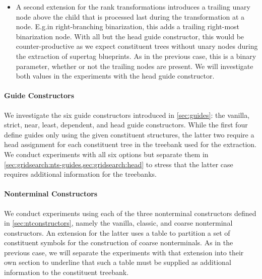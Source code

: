 \documentclass[../../document.tex]{subfiles}
\begin{document}
\begin{itemize}
        \item A second extension for the rank transformations introduces a trailing unary node above the child that is processed last during the transformation at a node. E.g.\@ in right-branching binarization, this adds a trailing right-most binarization node. With all but the head guide constructor, this would be counter-productive as we expect constituent trees without unary nodes during the extraction of supertag blueprints. As in the previous case, this is a binary parameter, whether or not the trailing nodes are present. We will investigate both values in the experiments with the head guide constructor.
    \end{itemize}

    \paragraph*{Guide Constructors}
    We investigate the six guide constructors introduced in \cref{sec:guides}: the vanilla, strict, near, least, dependent, and head guide constructors.
    While the first four define guides only using the given constituent structures, the latter two require a head assignment for each constituent tree in the treebank used for the extraction.
    We conduct experiments with all six options but separate them in \cref{sec:gridsearch:nts-guides,sec:gridsearch:head} to stress that the latter case requires additional information for the treebanks.

    \paragraph*{Nonterminal Constructors}
    We conduct experiments using each of the three nonterminal constructors defined in \cref{sec:ntconstructors}, namely the vanilla, classic, and coarse nonterminal constructors.
    An extension for the latter uses a table to partition a set of constituent symbols for the construction of coarse nonterminals.
    As in the previous case, we will separate the experiments with that extension into their own section to underline that such a table must be supplied as additional information to the constituent treebank.
\end{document}
